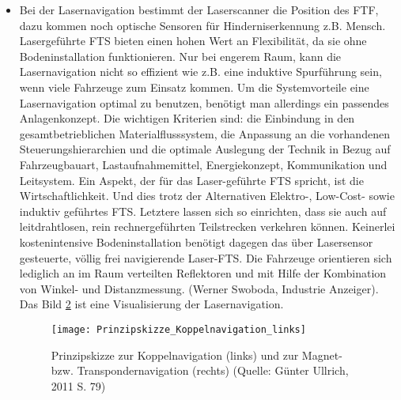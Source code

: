\begin{itemize}
\begin{figure}[h!]
	\label{Prinzipskizze_Koppelnavigation_rechts}
\end{figure}	
	\item Bei der Lasernavigation bestimmt der Laserscanner die Position des FTF, dazu kommen noch optische Sensoren f\"ur Hinderniserkennung z.B. Mensch. Lasergef\"uhrte FTS bieten einen hohen Wert an Flexibilit\"at, da sie ohne Bodeninstallation funktionieren. Nur bei engerem Raum, kann die Lasernavigation nicht so effizient wie z.B. eine induktive Spurf\"uhrung sein, wenn viele Fahrzeuge zum Einsatz kommen. Um die Systemvorteile eine Lasernavigation optimal zu benutzen, ben\"otigt man allerdings ein passendes Anlagenkonzept. Die wichtigen Kriterien sind: die Einbindung in den gesamtbetrieblichen Materialflusssystem, die Anpassung an die vorhandenen Steuerungshierarchien und die optimale Auslegung der Technik in Bezug auf Fahrzeugbauart, Lastaufnahmemittel, Energiekonzept, Kommunikation und Leitsystem. Ein Aspekt, der f\"ur das Laser-gef\"uhrte FTS spricht, ist die Wirtschaftlichkeit. Und dies trotz der Alternativen Elektro-, Low-Cost- sowie induktiv gef\"uhrtes FTS. Letztere lassen sich so einrichten, dass sie auch auf leitdrahtlosen, rein rechnergef\"uhrten Teilstrecken verkehren k\"onnen. Keinerlei kostenintensive Bodeninstallation ben\"otigt dagegen das \"uber Lasersensor gesteuerte, v\"ollig frei navigierende Laser-FTS. Die Fahrzeuge orientieren sich lediglich an im Raum verteilten Reflektoren und mit Hilfe der Kombination von Winkel- und Distanzmessung. (Werner Swoboda, Industrie Anzeiger). Das Bild \ref{Prinzipskizze_Koppelnavigation_links} ist eine Visualisierung der Lasernavigation.
	\begin{figure}[h!]
	\centering
  \texttt{[image: Prinzipskizze\_Koppelnavigation\_links]}
	\caption{Prinzipskizze zur Koppelnavigation (links) und zur Magnet- bzw. Transpondernavigation (rechts) (Quelle: G\"unter Ullrich, 2011 S. 79)}
	\label{Prinzipskizze_Koppelnavigation_links}
\end{figure}


\end{itemize}

